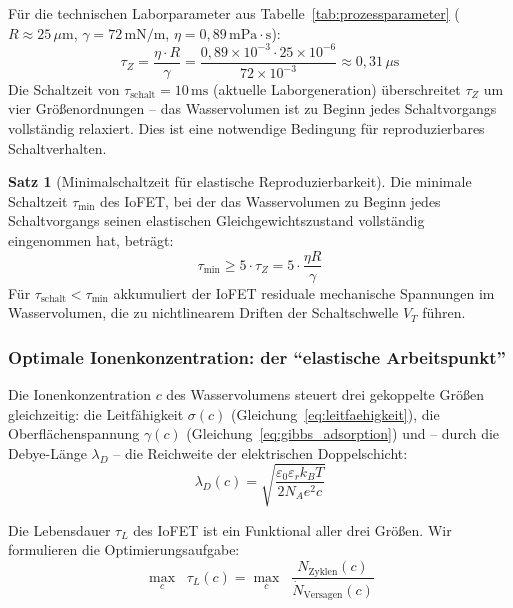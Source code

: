 ﻿\documentclass[a4paper,12pt]{scrreprt}
\theoremstyle{definition}
\newtheorem{satz}{Satz}[section]
\begin{document}
Für die technischen Laborparameter aus Tabelle~\ref{tab:prozessparameter}
($R \approx 25\,\mu$m, $\gamma = 72\,\mathrm{mN/m}$, $\eta = 0{,}89\,\mathrm{mPa\cdot s}$):
\begin{equation}
	\tau_Z = \frac{\eta \cdot R}{\gamma}
	= \frac{0{,}89 \times 10^{-3} \cdot 25 \times 10^{-6}}{72 \times 10^{-3}}
	\approx 0{,}31\,\mu\mathrm{s}
	\label{eq:tau_zener_wert}
\end{equation}
Die Schaltzeit von $\tau_{\mathrm{schalt}} = 10\,\mathrm{ms}$ (aktuelle
Laborgeneration) überschreitet $\tau_Z$ um vier Größenordnungen -- das
Wasservolumen ist zu Beginn jedes Schaltvorgangs vollständig relaxiert.
Dies ist eine notwendige Bedingung für reproduzierbares Schaltverhalten.

\begin{satz}[Minimalschaltzeit für elastische Reproduzierbarkeit]
	Die minimale Schaltzeit $\tau_{\mathrm{min}}$ des IoFET, bei der das
	Wasservolumen zu Beginn jedes Schaltvorgangs seinen elastischen
	Gleichgewichtszustand vollständig eingenommen hat, beträgt:
	\begin{equation}
		\tau_{\mathrm{min}} \geq 5 \cdot \tau_Z = 5 \cdot \frac{\eta R}{\gamma}
		\label{eq:min_schaltzeit}
	\end{equation}
	Für $\tau_{\mathrm{schalt}} < \tau_{\mathrm{min}}$ akkumuliert der IoFET
	residuale mechanische Spannungen im Wasservolumen, die zu nichtlinearem
	Driften der Schaltschwelle $V_T$ führen.
\end{satz}

\subsubsection{Optimale Ionenkonzentration: der ``elastische Arbeitspunkt''}

Die Ionenkonzentration $c$ des Wasservolumens steuert drei gekoppelte
Größen gleichzeitig: die Leitfähigkeit $\sigma(c)$
(Gleichung~\eqref{eq:leitfaehigkeit}), die Oberflächenspannung $\gamma(c)$
(Gleichung~\eqref{eq:gibbs_adsorption}) und -- durch die Debye-Länge $\lambda_D$ --
die Reichweite der elektrischen Doppelschicht:
\begin{equation}
	\lambda_D(c) = \sqrt{\frac{\varepsilon_0 \varepsilon_r k_B T}{2 N_A e^2 c}}
	\label{eq:debye_laenge}
\end{equation}

Die Lebensdauer $\tau_L$ des IoFET ist ein Funktional aller drei Größen.
Wir formulieren die Optimierungsaufgabe:
\begin{equation}
	\max_{c} \;\; \tau_L(c) = \max_{c} \;\;
	\frac{N_{\mathrm{Zyklen}}(c)}{\dot{N}_{\mathrm{Versagen}}(c)}
	\label{eq:optimierungsproblem}
\end{equation}
\end{document}
